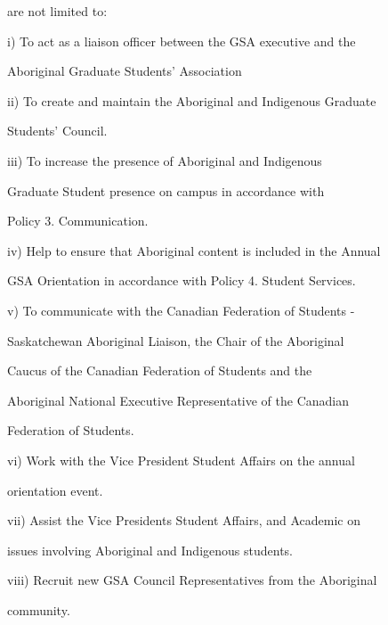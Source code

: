          are not limited to:   

  

         i)        To act as a liaison officer between the GSA executive and the  

                   Aboriginal Graduate Students' Association   

  

         ii)       To create and maintain the Aboriginal and Indigenous Graduate  

                   Students’ Council.   

  

         iii)      To      increase       the     presence        of    Aboriginal          and     Indigenous  

                   Graduate  Student  presence  on  campus  in  accordance  with  

                   Policy 3. Communication.   

  

         iv)       Help to ensure that Aboriginal content is included in the Annual  

                   GSA Orientation in accordance with Policy 4. Student Services.   

  

         v)        To  communicate  with  the  Canadian  Federation  of  Students  - 

                   Saskatchewan Aboriginal  Liaison, the  Chair of  the  Aboriginal  

                   Caucus   of   the   Canadian   Federation   of   Students   and   the  

                   Aboriginal National Executive Representative of the Canadian  

                   Federation of Students.   

         vi)       Work  with  the  Vice  President  Student  Affairs  on  the  annual  

                   orientation event.  

         vii)      Assist  the  Vice  Presidents  Student  Affairs,  and  Academic  on  

                   issues involving Aboriginal and Indigenous students.  

         viii)     Recruit new GSA Council Representatives from the Aboriginal  

                   community.  

                     

